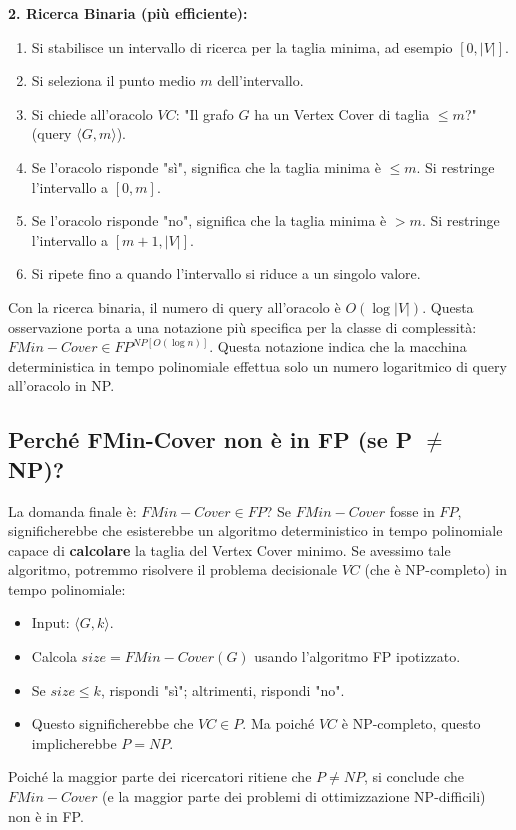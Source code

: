 \documentclass[a4paper, 11pt]{book} %
\theoremstyle{definition}
\begin{document}
\textbf{2. Ricerca Binaria (più efficiente):}
\begin{enumerate}
    \item Si stabilisce un intervallo di ricerca per la taglia minima, ad esempio $[0, |V|]$.
    \item Si seleziona il punto medio $m$ dell'intervallo.
    \item Si chiede all'oracolo $VC$: "Il grafo $G$ ha un Vertex Cover di taglia $\le m$?" (query $\langle G, m \rangle$).
    \item Se l'oracolo risponde "sì", significa che la taglia minima è $\le m$. Si restringe l'intervallo a $[0, m]$.
    \item Se l'oracolo risponde "no", significa che la taglia minima è $> m$. Si restringe l'intervallo a $[m+1, |V|]$.
    \item Si ripete fino a quando l'intervallo si riduce a un singolo valore.
\end{enumerate}
Con la ricerca binaria, il numero di query all'oracolo è $O(\log |V|)$.
Questa osservazione porta a una notazione più specifica per la classe di complessità:
$FMin-Cover \in FP^{NP[O(\log n)]}$. Questa notazione indica che la macchina deterministica in tempo polinomiale effettua solo un numero logaritmico di query all'oracolo in NP.

\subsection{Perché FMin-Cover non è in FP (se P $\neq$ NP)?}
La domanda finale è: $FMin-Cover \in FP$?
Se $FMin-Cover$ fosse in $FP$, significherebbe che esisterebbe un algoritmo deterministico in tempo polinomiale capace di \textbf{calcolare} la taglia del Vertex Cover minimo.
Se avessimo tale algoritmo, potremmo risolvere il problema decisionale $VC$ (che è NP-completo) in tempo polinomiale:
\begin{itemize}
    \item Input: $\langle G, k \rangle$.
    \item Calcola $size = FMin-Cover(G)$ usando l'algoritmo FP ipotizzato.
    \item Se $size \le k$, rispondi "sì"; altrimenti, rispondi "no".
\item Questo significherebbe che $VC \in P$. Ma poiché $VC$ è NP-completo, questo implicherebbe $P=NP$.
\end{itemize}
Poiché la maggior parte dei ricercatori ritiene che $P \neq NP$, si conclude che $FMin-Cover$ (e la maggior parte dei problemi di ottimizzazione NP-difficili) non è in FP.
\end{document}
